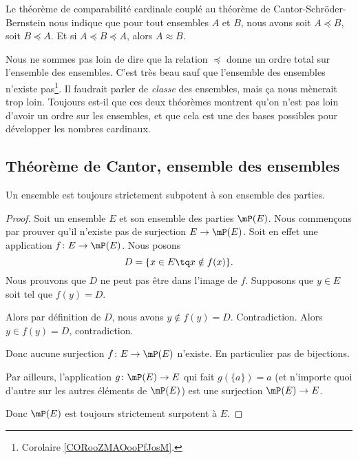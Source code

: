 \begin{normaltext}	\label{NORMooOrdreSurEnsembles}
	Le théorème de comparabilité cardinale couplé au théorème de Cantor-Schröder-Bernstein nous indique que pour tout ensembles \( A\) et \( B\), nous avons soit \( A\preceq B\), soit \( B\preceq A\). Et si \( A\preceq B\preceq A\), alors \( A\approx B\).

	Nous ne sommes pas loin de dire que la relation \( \preceq\) donne un ordre total sur l'ensemble des ensembles. C'est très beau sauf que l'ensemble des ensembles n'existe pas\footnote{Corolaire \ref{CORooZMAOooPfJosM}.}. Il faudrait parler de \emph{classe} des ensembles, mais ça nous mènerait trop loin. Toujours est-il que ces deux théorèmes montrent qu'on n'est pas loin d'avoir un ordre sur les ensembles, et que cela est une des bases possibles pour développer les nombres cardinaux.
\end{normaltext}

\subsection{Théorème de Cantor, ensemble des ensembles}
\label{SUBooThmCantor}

\begin{theorem}     \label{THOooJPNFooWSxUhd}
	Un ensemble est toujours strictement subpotent à son ensemble des parties.
\end{theorem}

\begin{proof}
	Soit un ensemble \( E\) et son ensemble des parties \( \mP(E)\). Nous commençons par prouver qu'il n'existe pas de surjection \( E\to \mP(E)\). Soit en effet une application \( f\colon E\to \mP(E)\). Nous posons
	\begin{equation}
		D=\{ x\in E\tq x\notin f(x) \}.
	\end{equation}
	Nous prouvons que \( D\) ne peut pas être dans l'image de \( f\). Supposons que \( y\in E\) soit tel que \( f(y)=D\).
	\begin{subproof}
		\spitem[Si \( y\in D\)]
		Alors par définition de \( D\), nous avons \( y\notin f(y)=D\). Contradiction.
		\spitem[Si \( y\notin D\)]
		Alors \( y\in f(y)=D\), contradiction.
	\end{subproof}
	Donc aucune surjection \( f\colon E\to \mP(E)\) n'existe. En particulier pas de bijections.

	Par ailleurs, l'application \( g\colon \mP(E)\to E\) qui fait \( g(\{ a \})=a\) (et n'importe quoi d'autre sur les autres éléments de \( \mP(E)\)) est une surjection \( \mP(E)\to E\).

	Donc \( \mP(E)\) est toujours strictement surpotent à \( E\).
\end{proof}

